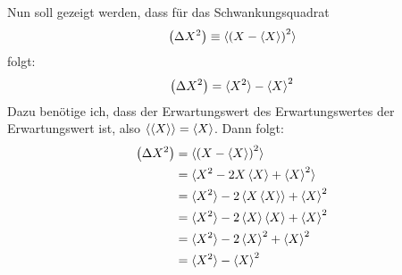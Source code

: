 \documentclass[11pt, ngerman, fleqn, DIV=15, headinclude]{scrartcl}
\begin{document}
\subsubsection{}
Nun soll gezeigt werden, dass für das Schwankungsquadrat
\begin{align*}
	\left( \Delta X^2 \right)\equiv\braket{\left( X - \braket{X} \right)^2}
\end{align*}
folgt:
\begin{align*}
	\left( \Delta X^2 \right)=\braket{X^2} - \braket{X}^2
\end{align*}
Dazu benötige ich, dass der Erwartungswert des Erwartungswertes der Erwartungswert ist, also $\braket{\braket{X}} = \braket{X}$. Dann folgt:
\begin{align*}
	\left( \Delta X^2 \right)	&= \braket{\left( X - \braket{X} \right)^2}\\
						&= \braket{X^2 - 2X\braket{X} + \braket{X}^2}\\
						&= \braket{X^2} - 2\braket{X\braket{X}} + \braket{X}^2\\
						&= \braket{X^2} - 2\braket{X}\braket{X} + \braket{X}^2\\
						&= \braket{X^2} - 2\braket{X}^2 + \braket{X}^2\\
						&= \braket{X^2} - \braket{X}^2
\end{align*}
\end{document}
